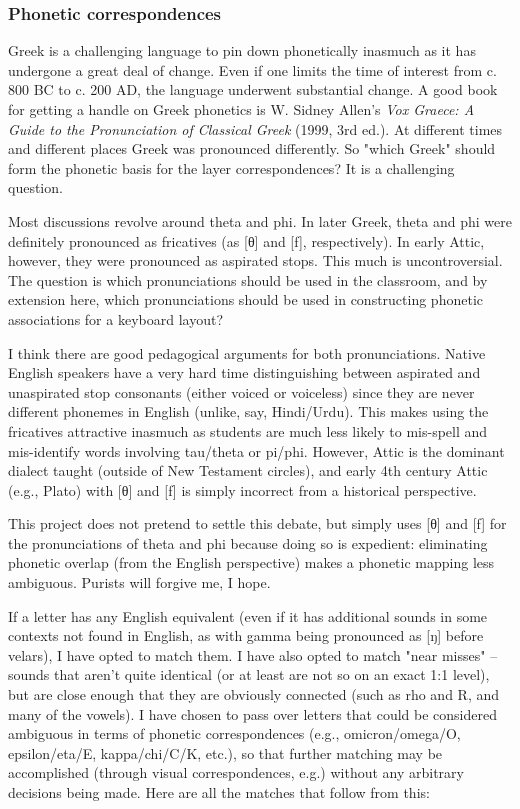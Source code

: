 \documentclass[11pt]{article}
\begin{document}
\subsubsection{Phonetic correspondences}
\label{sec:org23c6621}

Greek is a challenging language to pin down phonetically inasmuch as it has undergone a great deal of change. Even if one limits the time of interest from c. 800 BC to c. 200 AD, the language underwent substantial change. A good book for getting a handle on Greek phonetics is W. Sidney Allen's \emph{Vox Graece: A Guide to the Pronunciation of Classical Greek} (1999, 3rd ed.). At different times and different places Greek was pronounced differently. So "which Greek" should form the phonetic basis for the layer correspondences? It is a challenging question.

Most discussions revolve around theta and phi. In later Greek, theta and phi were definitely pronounced as fricatives (as [θ] and [f], respectively). In early Attic, however, they were pronounced as aspirated stops. This much is uncontroversial. The question is which pronunciations should be used in the classroom, and by extension here, which pronunciations should be used in constructing phonetic associations for a keyboard layout?

I think there are good pedagogical arguments for both pronunciations. Native English speakers have a very hard time distinguishing between aspirated and unaspirated stop consonants (either voiced or voiceless) since they are never different phonemes in English (unlike, say, Hindi/Urdu). This makes using the fricatives attractive inasmuch as students are much less likely to mis-spell and mis-identify words involving tau/theta or pi/phi. However, Attic is the dominant dialect taught (outside of New Testament circles), and early 4th century Attic (e.g., Plato) with [θ] and [f] is simply incorrect from a historical perspective.

This project does not pretend to settle this debate, but simply uses [θ] and [f] for the pronunciations of theta and phi because doing so is expedient: eliminating phonetic overlap (from the English perspective) makes a phonetic mapping less ambiguous. Purists will forgive me, I hope.

If a letter has any English equivalent (even if it has additional sounds in some contexts not found in English, as with gamma being pronounced as [ŋ] before velars), I have opted to match them. I have also opted to match "near misses" -- sounds that aren't quite identical (or at least are not so on an exact 1:1 level), but are close enough that they are obviously connected (such as rho and R, and many of the vowels). I have chosen to pass over letters that could be considered ambiguous in terms of phonetic correspondences (e.g., omicron/omega/O, epsilon/eta/E, kappa/chi/C/K, etc.), so that further matching may be accomplished (through visual correspondences, e.g.) without any arbitrary decisions being made. Here are all the matches that follow from this:
\end{document}
